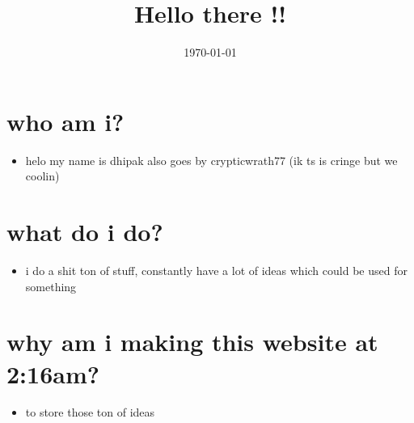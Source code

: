 \documentclass[11pt]{article}
\date{\today}
\title{Hello there !!}
\begin{document}
\maketitle
\section*{who am i?}
\label{sec:orgbd4decb}
\begin{itemize}
\item helo my name is dhipak also goes by crypticwrath77 (ik ts is cringe but we coolin)
\end{itemize}
\section*{what do i do?}
\label{sec:orgd14df89}
\begin{itemize}
\item i do a shit ton of stuff, constantly have a lot of ideas which could be used for something
\end{itemize}
\section*{why am i making this website at 2:16am?}
\label{sec:org647ecfa}
\begin{itemize}
\item to store those ton of ideas
\end{itemize}
\end{document}
